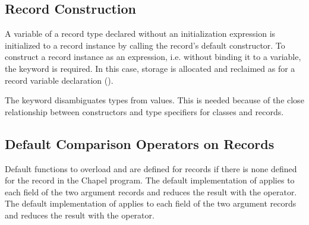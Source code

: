 \subsection{Record Construction}

A variable of a record type declared without an initialization expression
is initialized to a record instance by calling the record's default constructor.
To construct a record instance as an expression,
i.e. without binding it to a variable, the  keyword is
required.  In this case, storage is allocated and reclaimed as for a record
variable declaration ().
\begin{rationale}
The  keyword disambiguates types from values. This is needed because of the close
relationship between constructors and type specifiers for classes and
records.
\end{rationale}

\subsection{Default Comparison Operators on Records}
\label{Record_Comparison_Operators}

Default functions to overload \chpl{==} and \chpl{\!=} are defined for
records if there is none defined for the record in the Chapel program.
The default implementation of \chpl{==} applies \chpl{==} to each
field of the two argument records and reduces the result with
the \chpl{&&} operator.  The default implementation of \chpl{\!=}
applies \chpl{\!=} to each field of the two argument records and
reduces the result with the \chpl{||} operator.
